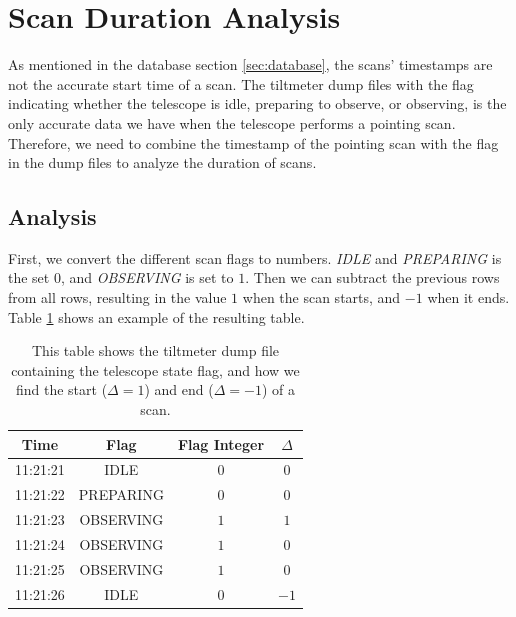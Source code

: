 
\section{Scan Duration Analysis}\label{sec:scan_duration_analysis}
As mentioned in the database section \ref{sec:database}, the scans' timestamps are not the accurate start time of a scan.
The tiltmeter dump files with the flag indicating whether the telescope is idle, preparing to observe, or observing,
is the only accurate data we have when the telescope performs a pointing scan.
Therefore, we need to combine the timestamp of the pointing scan with the flag in the dump files to analyze the duration of scans.

\subsection{Analysis}
First, we convert the different scan flags to numbers.
\textit{IDLE} and \textit{PREPARING} is the set $0$, and \textit{OBSERVING} is set to $1$.
Then we can subtract the previous rows from all rows, resulting in the value $1$ when the scan starts, and $-1$ when it ends.
Table \ref{tab:scan_flag_difference} shows an example of the resulting table.


\begin{table}[H]
    \centering
    \begin{tabular}{cccc}
        \toprule
        Time & Flag & Flag Integer & $\Delta$ \\
        \midrule
        11:21:21 & IDLE & $0$ & $0$ \\
        11:21:22 & PREPARING & $0$ & $0$ \\
        11:21:23 & OBSERVING & $1$ & $1$ \\
        11:21:24 & OBSERVING & $1$ & $0$ \\
        11:21:25 & OBSERVING & $1$ & $0$ \\
        11:21:26 & IDLE & $0$ & $-1$ \\
        \bottomrule
    \end{tabular}
    \caption[Tiltmeter dump file with $\Delta$ for analysis]{This table shows the tiltmeter dump file containing the telescope state flag,
            and how we find the start ($\Delta = 1$) and end ($\Delta = -1$) of a scan.}
    \label{tab:scan_flag_difference}
\end{table}


